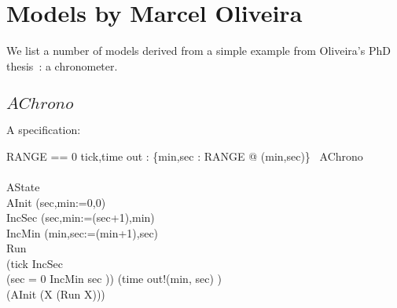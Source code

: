 \section{Models by Marcel Oliveira}

We list a number of models derived from a simple example from
Oliveira's PhD thesis~\cite{MV05}: a chronometer.

\subsection{$AChrono$}

A specification:
\begin{circus}
RANGE == 0 
\also \circchannel tick,time
\also \circchannel out : \{min,sec : RANGE @ (min,sec)\}
\also
\circprocess\ AChrono \circdef\\
\circbegin\\
\circstate AState \\
AInit \circdef (sec,min:=0,0)\\
IncSec \circdef (sec,min:=(sec+1),min)\\
IncMin \circdef (min,sec:=(min+1),sec)\\
Run \circdef \\

   (tick \then IncSec \circseq \\
    (\circif  sec = 0 \circthen IncMin
        \circelse sec  \circthen \Skip \circfi ))
    \extchoice (time \then out!(min, sec) \then \Skip) \\
\circspot (AInit \circseq (\circmu X \circspot (Run \circseq X)))\\
\circend
\end{circus}

